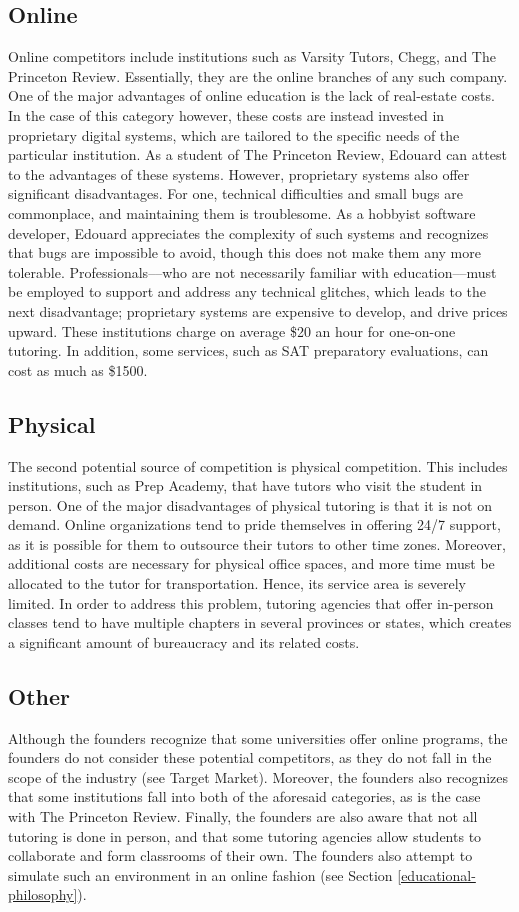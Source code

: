 \documentclass{business}
\begin{document}
    \subsection{Online}
    Online competitors include institutions such as Varsity Tutors, Chegg, and The Princeton Review. Essentially, they are the online branches of any such company. One of the major advantages of online education is the lack of real-estate costs. In the case of this category however, these costs are instead invested in proprietary digital systems, which are tailored to the specific needs of the particular institution. As a student of The Princeton Review, Edouard can attest to the advantages of these systems. However, proprietary systems also offer significant disadvantages. For one, technical difficulties and small bugs are commonplace, and maintaining them is troublesome. As a hobbyist software developer, Edouard appreciates the complexity of such systems and recognizes that bugs are impossible to avoid, though this does not make them any more tolerable. Professionals––who are not necessarily familiar with education––must be employed to support and address any technical glitches, which leads to the next disadvantage; proprietary systems are expensive to develop, and drive prices upward. These institutions charge on average \$20 an hour for one-on-one tutoring. In addition, some services, such as SAT preparatory evaluations, can cost as much as \$1500.
    \subsection{Physical}\label{phsyical-competition}
    The second potential source of competition is physical competition. This includes institutions, such as Prep Academy, that have tutors who visit the student in person. One of the major disadvantages of physical tutoring is that it is not on demand. Online organizations tend to pride themselves in offering 24/7 support, as it is possible for them to outsource their tutors to other time zones. Moreover, additional costs are necessary for physical office spaces, and more time must be allocated to the tutor for transportation. Hence, its service area is severely limited. In order to address this problem, tutoring agencies that offer in-person classes tend to have multiple chapters in several provinces or states, which creates a significant amount of bureaucracy and its related costs.
    \subsection{Other}
    Although the founders recognize that some universities offer online programs, the founders do not consider these potential competitors, as they do not fall in the scope of the industry (see Target Market). Moreover, the founders also recognizes that some institutions fall into both of the aforesaid categories, as is the case with The Princeton Review. Finally, the founders are also aware that not all tutoring is done in person, and that some tutoring agencies allow students to collaborate and form classrooms of their own. The founders also attempt to simulate such an environment in an online fashion (see Section \ref{educational-philosophy}).
\end{document}

